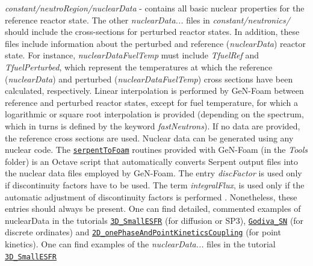 \begin{DoxyItemize}
\item {\itshape constant/neutro\+Region/nuclear\+Data} -\/ contains all basic nuclear properties for the reference reactor state. The other {\itshape nuclear\+Data...} files in {\itshape constant/neutronics/} should include the cross-\/sections for perturbed reactor states. In addition, these files include information about the perturbed and reference ({\itshape nuclear\+Data}) reactor state. For instance, {\itshape nuclear\+Data\+Fuel\+Temp} must include {\itshape Tfuel\+Ref} and {\itshape Tfuel\+Perturbed}, which represent the temperatures at which the reference ({\itshape nuclear\+Data}) and perturbed ({\itshape nuclear\+Data\+Fuel\+Temp}) cross sections have been calculated, respectively. Linear interpolation is performed by Ge\+N-\/\+Foam between reference and perturbed reactor states, except for fuel temperature, for which a logarithmic or square root interpolation is provided (depending on the spectrum, which in turns is defined by the keyword {\itshape fast\+Neutrons}). If no data are provided, the reference cross sections are used. Nuclear data can be generated using any nuclear code. The \href{https://gitlab.com/foam-for-nuclear/GeN-Foam/-/tree/master/Tools/serpentToFoam/serpent2.1.23}{\tt serpent\+To\+Foam} routines provided with Ge\+N-\/\+Foam (in the {\itshape Tools} folder) is an Octave script that automatically converts Serpent output files into the nuclear data files employed by Ge\+N-\/\+Foam. The entry {\itshape disc\+Factor} is used only if discontinuity factors have to be used. The term {\itshape integral\+Flux}, is used only if the automatic adjustment of discontinuity factors is performed \cite{FIORINA2016212}. Nonetheless, these entries should always be present. One can find detailed, commented examples of nuclear\+Data in the tutorials \href{https://gitlab.com/foam-for-nuclear/GeN-Foam/-/tree/master/Tutorials/3D_SmallESFR/rootCase/constant/neutroRegion/nuclearData}{\tt 3\+D\+\_\+\+Small\+E\+S\+FR} (for diffusion or S\+P3), \href{https://gitlab.com/foam-for-nuclear/GeN-Foam/-/tree/master/Tutorials/Godiva_SN/constant/neutroRegion/nuclearData}{\tt Godiva\+\_\+\+SN} (for discrete ordinates) and \href{https://gitlab.com/foam-for-nuclear/GeN-Foam/-/tree/master/Tutorials/2D_onePhaseAndPointKineticsCoupling/rootCase/constant/neutroRegion/nuclearData}{\tt 2\+D\+\_\+one\+Phase\+And\+Point\+Kinetics\+Coupling} (for point kinetics). One can find examples of the {\itshape nuclear\+Data...} files in the tutorial \href{https://gitlab.com/foam-for-nuclear/GeN-Foam/-/tree/master/Tutorials/3D_SmallESFR/rootCase/constant/neutroRegion}{\tt 3\+D\+\_\+\+Small\+E\+S\+FR}

\end{DoxyItemize}
